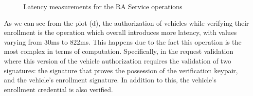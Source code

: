 	\begin{figure}
		\begin{subfigmatrix}{2}
		\end{subfigmatrix}
		\caption{Latency measurements for the RA Service operations}
		\label{fig:graphs2}
	\end{figure}
	
	
	
	As we can see from the plot (d), the authorization of vehicles while verifying their enrollment is the operation which overall introduces more latency, with values varying from 30ms to 822ms. This happens due to the fact this operation is the most complex in terms of computation. Specifically, in the request validation where this version of the vehicle authorization requires the validation of two signatures: the signature that proves the possession of the verification keypair, and the vehicle's enrollment signature. In addition to this, the vehicle's enrollment credential is also verified.
	
